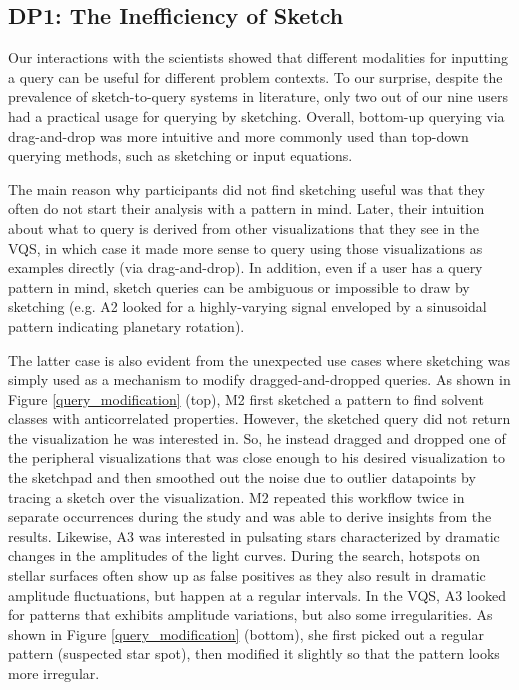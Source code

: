 \subsection{DP1: The Inefficiency of Sketch}
\par Our interactions with the scientists showed that different modalities for inputting a query can be useful for different problem contexts. To our surprise, despite the prevalence of sketch-to-query systems in literature, only two out of our nine users had a practical usage for querying by sketching. Overall, bottom-up querying via drag-and-drop was more intuitive and more commonly used than top-down querying methods, such as sketching or input equations.
\par The main reason why participants did not find sketching useful was that they often do not start their analysis with a pattern in mind. Later, their intuition about what to query is derived from other visualizations that they see in the VQS, in which case it made more sense to query using those visualizations as examples directly (via drag-and-drop). In addition, even if a user has a query pattern in mind, sketch queries can be ambiguous or impossible to draw by sketching (e.g. A2 looked for a highly-varying signal enveloped by a sinusoidal pattern indicating planetary rotation).
\par The latter case is also evident from the unexpected use cases where sketching was simply used as a mechanism to modify dragged-and-dropped queries. As shown in Figure \ref{query_modification} (top), M2 first sketched a pattern to find solvent classes with anticorrelated properties. However, the sketched query did not return the visualization he was interested in. So, he instead dragged and dropped one of the peripheral visualizations that was close enough to his desired visualization to the sketchpad and then smoothed out the noise due to outlier datapoints by tracing a sketch over the visualization. M2 repeated this workflow twice in separate occurrences during the study and was able to derive insights from the results. Likewise, A3 was interested in pulsating stars characterized by dramatic changes in the amplitudes of the light curves. During the search, hotspots on stellar surfaces often show up as false positives as they also result in dramatic amplitude fluctuations, but happen at a regular intervals. In the VQS, A3 looked for patterns that exhibits amplitude variations, but also some irregularities. As shown in Figure \ref{query_modification} (bottom), she first picked out a regular pattern (suspected star spot), then modified it slightly so that the pattern looks more irregular.
